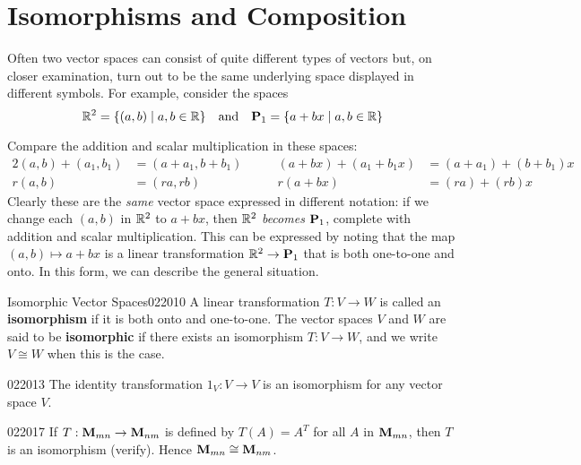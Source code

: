 \section{Isomorphisms and Composition}
\label{sec:7_3}

Often two vector spaces can consist of quite different types of vectors but, on closer examination, turn out to be the same underlying space displayed in different symbols. For example, consider the spaces
\begin{equation*}
\mathbb{R}^2 = \{(a, b) \mid a, b \in \mathbb{R}\} \quad \mbox{and} \quad \textbf{P}_1 = \{a + bx \mid a, b \in \mathbb{R}\}
\end{equation*}

Compare the addition and scalar multiplication in these spaces:
\begin{alignat*}{2}
(a, b) + (a_1, b_1) &= (a + a_1, b + b_1) \quad & \quad (a + bx) + (a_1 + b_1x) &= (a + a_1) + (b + b_1)x \\
r(a, b) &= (ra, rb) \quad & \quad r(a + bx) &= (ra) + (rb)x
\end{alignat*}
Clearly these are the \textit{same} vector space expressed in different notation: if we change each $(a, b)$ in $\mathbb{R}^2$ to $a + bx$, then $\mathbb{R}^2$ \textit{becomes} $\textbf{P}_{1}$, complete with addition and scalar multiplication. This can be expressed by noting that the map $(a, b) \mapsto a + bx$ is a linear transformation $\mathbb{R}^2 \to \textbf{P}_{1}$ that is both one-to-one and onto. In this form, we can describe the general situation.


\begin{definition}{Isomorphic Vector Spaces}{022010}
A linear transformation $T : V \to W$ is called an \textbf{isomorphism} if it is both onto and one-to-one. The vector spaces $V$ and $W$ are said to be \textbf{isomorphic} if there exists an isomorphism $T : V \to W$, and we write $V \cong W$ when this is the case.
\end{definition}

\begin{example}{}{022013}
The identity transformation $1_{V} : V \to V$ is an isomorphism for any vector space $V$.
\end{example}

\begin{example}{}{022017}
If $T : \textbf{M}_{mn} \to \textbf{M}_{nm}$ is defined by $T(A) = A^{T}$ for all $A$ in $\textbf{M}_{mn}$, then $T$ is an isomorphism (verify). Hence $\textbf{M}_{mn} \cong \textbf{M}_{nm}$.
\end{example}

